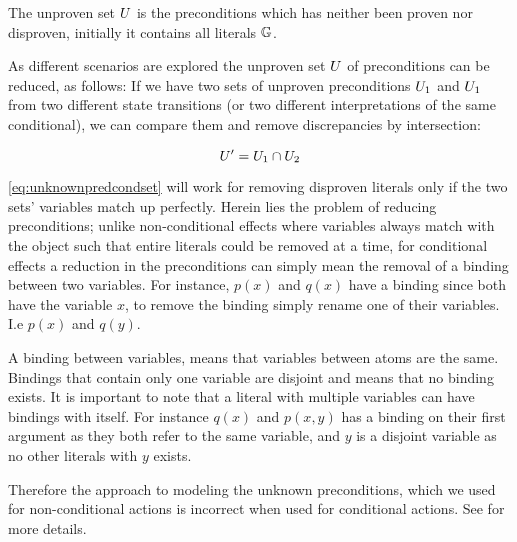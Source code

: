 \documentclass[\master/Master.tex]{subfiles}
\begin{document}
\begin{definition}
The unproven set $U$ is the preconditions which has neither been proven nor disproven, initially it contains all  literals $\mathbb{G}$.
\end{definition}


As different scenarios are explored the unproven set $U$ of preconditions can be reduced, as follows:
If we have two sets of unproven preconditions $U_1$ and $U_1$ from two different state transitions (or two different interpretations of the same conditional), we can compare them and remove discrepancies by intersection:

\begin{equation}
\label{eq:unknownpredcondset}
	U' = U_1 \cap U_2
\end{equation}

\eqref{eq:unknownpredcondset} will work for removing  disproven literals only if the two sets' variables match up perfectly. Herein lies the problem of reducing preconditions; unlike non-conditional effects where variables always match with the object such that entire literals could be removed at a time, for conditional effects a reduction in the preconditions can simply mean the removal of a binding between two variables. For instance, $p(x)$ and $q(x)$ have a binding since both have the variable $x$, to remove the binding simply rename one of their variables. I.e $p(x)$ and $q(y)$.

\begin{definition}[Binding]\label{def:ca:binding}
    A binding between variables, means that variables between atoms are the same.
	Bindings that contain only one variable are disjoint and means that no binding exists.
	It is important to note that a literal with multiple variables can have bindings with itself.
	For instance $q(x)$ and $p(x,y)$ has a binding on their first argument as they both refer to the same variable, and $y$ is a disjoint variable as no other literals with $y$ exists.
\end{definition}
Therefore the approach to modeling the unknown preconditions, which we used for non-conditional actions is incorrect when used for conditional actions. See  for more details.
\end{document}
